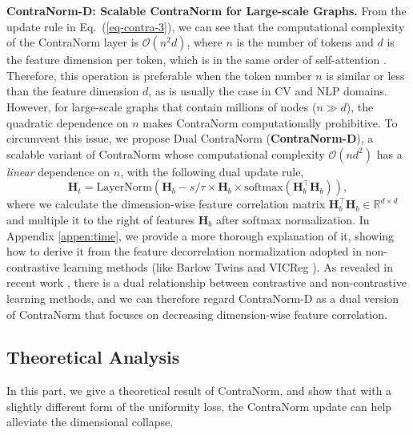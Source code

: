 \documentclass{article}
\def\mH{{\bm{H}}}
\def\gO{{\mathcal{O}}}
\def\sR{{\mathbb{R}}}
\newcommand{\softmax}{\mathrm{softmax}}
\theoremstyle{definition}
\theoremstyle{remark}
\theoremstyle{theorem}
\begin{document}
\textbf{ContraNorm-D: Scalable ContraNorm for Large-scale Graphs.}
From the update rule in Eq.~(\ref{eq-contra-3}), we can see that the computational complexity of the ContraNorm layer is $\gO(n^2d)$, where $n$ is the number of tokens and $d$ is the feature dimension per token, which is in the same order of self-attention \citep{vaswani2017attention}. Therefore, this operation is preferable when the token number $n$ is similar or less than the feature dimension $d$, as is usually the case in CV and NLP domains. However, for large-scale graphs that contain millions of nodes ($n\gg d$), the quadratic dependence on $n$ makes ContraNorm computationally prohibitive. To circumvent this issue, we propose Dual ContraNorm (\textbf{ContraNorm-D}), a scalable variant of ContraNorm whose computational complexity $\gO(nd^2)$ has a \textit{linear} dependence on $n$, with the following dual update rule,
\begin{equation} \label{eq-contra-4}
    \mH_t = \mbox{LayerNorm}\left(\mH_b - s/\tau \times \mH_b \times \softmax(\mH_b^{\top}\mH_b)\right),
\end{equation}
where we calculate the dimension-wise feature correlation matrix $\mH_b^{\top}\mH_b\in\sR^{d\times d}$ and multiple it to the right of features $\mH_b$ after softmax normalization. In Appendix \ref{appen:time}, we provide a more thorough explanation of it, showing how to derive it from the feature decorrelation normalization adopted in non-contrastive learning methods (like Barlow Twins \citep{zbontar2021barlow} and VICReg \citep{bardes2021vicreg}). As revealed in recent work \citep{garrido2022duality}, there is a dual relationship between contrastive and non-contrastive learning methods, and we can therefore regard ContraNorm-D as a dual version of ContraNorm that focuses on decreasing dimension-wise feature correlation.


\subsection{Theoretical Analysis}
\label{sec:theoretical-analysis}

In this part, we give a theoretical result of ContraNorm, and show that with a slightly different form of the uniformity loss, the ContraNorm update can help alleviate the dimensional collapse. 
\end{document}

